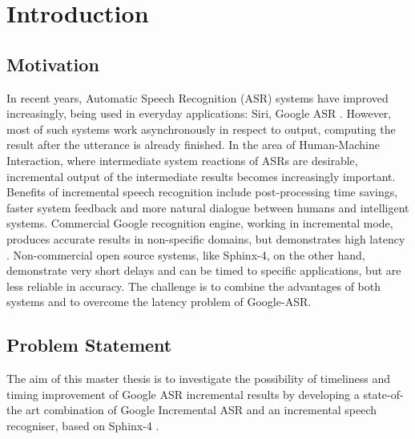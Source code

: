  
\section{Introduction}
\subsection {Motivation}
In recent years, Automatic Speech Recognition (ASR) systems have improved
increasingly, being used in everyday applications: Siri, Google ASR 
\parencite {mcgrawgrauenstein2012}. However, most of such systems work
asynchronously in respect to output, computing the result after the utterance is already finished.
In the area of Human-Machine Interaction, 
where intermediate system reactions of ASRs are 
desirable,  incremental output of the intermediate results becomes increasingly
important. Benefits of  incremental speech recognition include post-processing
time savings, faster system feedback and more natural dialogue between humans
and intelligent systems. Commercial Google recognition
engine, working in incremental mode, produces accurate
results in non-specific domains, but demonstrates high latency \parencite{mcgrawgrauenstein2012}.  Non-commercial open source systems, like Sphinx-4, on
the other hand, demonstrate very short delays and can be timed to specific
applications, but are less reliable in accuracy.
The challenge is to combine the advantages of both systems and  to overcome the latency problem of Google-ASR.
\subsection {Problem Statement}
The aim of this master thesis is to investigate the possibility of
timeliness and timing improvement of Google ASR
incremental results by developing a state-of-the art 
combination of Google Incremental ASR \parencite {mcgrawgrauenstein2012} and an
incremental speech recogniser, based on Sphinx-4 \parencite
{baumannetal2009:naacl}. 

